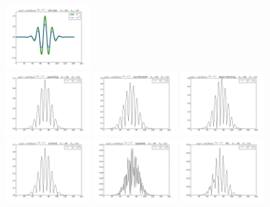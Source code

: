 \documentclass{article} %
\theoremstyle{plain}
\numberwithin{equation}{section} %
\numberwithin{figure}{section} %
\numberwithin{table}{section} %
\begin{document}
\begin{enumerate}[\ \ (a)]
\begin{figure}[ht!]
            \includegraphics[width=0.29\textwidth]{figures/power_4/problem_2_1_7_a.png}\\
            \includegraphics[width=0.29\textwidth]{figures/power_4/problem_2_1_1_b.png}
            \includegraphics[width=0.29\textwidth]{figures/power_4/problem_2_1_2_b.png}
            \includegraphics[width=0.29\textwidth]{figures/power_4/problem_2_1_3_b.png}
            \includegraphics[width=0.29\textwidth]{figures/power_4/problem_2_1_4_b.png}
            \includegraphics[width=0.29\textwidth]{figures/power_4/problem_2_1_5_b.png}
            \includegraphics[width=0.29\textwidth]{figures/power_4/problem_2_1_6_b.png}

\end{figure}
\end{enumerate}
\end{document}
